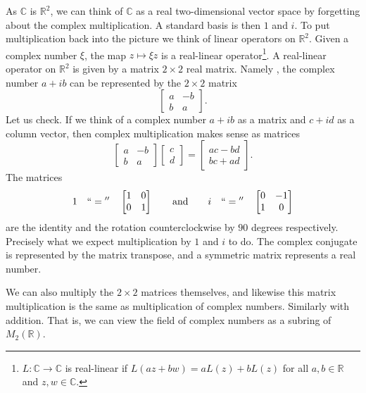 \documentclass[12pt,openany]{book}
\newcommand{\C}{{\mathbb{C}}}
\newcommand{\R}{{\mathbb{R}}}
\theoremstyle{plain}
\theoremstyle{remark}
\theoremstyle{definition}
\theoremstyle{exercise}
\theoremstyle{example}
\begin{document}
As $\C$ is $\R^2$, we can think of
$\C$ as a real two-dimensional vector space by forgetting about the
complex multiplication.  A standard basis is then $1$ and $i$.
To put multiplication back into the picture we think of linear operators
on $\R^2$.
Given a complex number $\xi$, the map $z \mapsto  \xi z$ is a
real-linear operator\footnote{$L \colon \C \to \C$ is real-linear if
$L(a z + b w) = aL(z)+bL(z)$ for all $a,b \in \R$ and $z,w \in \C$.}.
A real-linear operator on $\R^2$ is given by a matrix $2 \times 2$ real
matrix.
Namely , the complex number $a+ib$ can be represented by the $2 \times 2$ matrix
\begin{equation} \label{eq:complexnumbermatrix}
\begin{bmatrix}
a & -b \\
b & a
\end{bmatrix} .
\end{equation}
Let us check.
If we think of a complex number $a+ib$ as a matrix
and $c+id$ as a column vector,
then complex multiplication makes sense as matrices
\begin{equation*}
\begin{bmatrix}
a & -b \\
b & a
\end{bmatrix}
\begin{bmatrix}
c \\
d 
\end{bmatrix}
=
\begin{bmatrix}
ac-bd \\
bc+ad
\end{bmatrix} .
\end{equation*}
The matrices
\begin{equation*}
1 \quad ``{}={}'' \quad
\begin{bmatrix}
1 & 0 \\
0 & 1
\end{bmatrix} \qquad \text{and} \qquad
i \quad ``{}={}'' \quad
\begin{bmatrix}
0 & -1 \\
1 & 0
\end{bmatrix} 
\end{equation*}
are the identity and the rotation counterclockwise by $90$ degrees
respectively.  Precisely what we expect multiplication by $1$ and $i$
to do.
The complex conjugate is represented by the
matrix transpose, and a symmetric matrix represents a real number.

We can also multiply the $2 \times 2$ matrices themselves,
and likewise this matrix multiplication is the same as multiplication of complex
numbers.  Similarly with addition.
That is, we can view the field of complex numbers as a subring of $M_2(\R)$.
\end{document}
